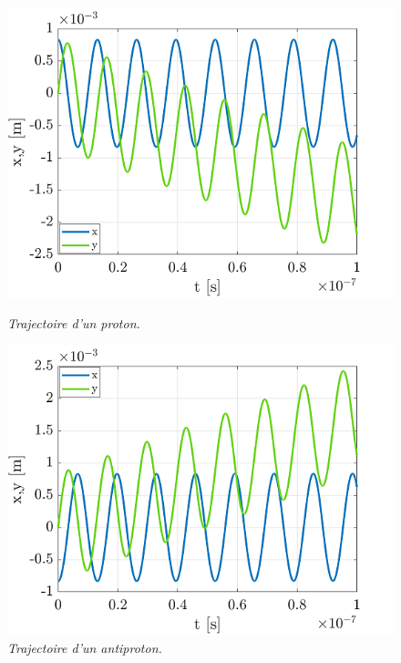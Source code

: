\documentclass[a4paper,12pt,twoside]{article}
\begin{document}
\begin{figure}
\begin{minipage}[c]{.46\linewidth}
					\centering
					\includegraphics[scale = 0.6]{proton_pos.png}
					\caption{\em\label{Fig: Pos Prot} Trajectoire d'un proton.}
				\end{minipage}
				\hfill%
				\begin{minipage}[c]{.46\linewidth}
					\centering
					\includegraphics[scale = 0.6]{antiproton_pos.png}
					\caption{\em\label{Fig: Pos Anti} Trajectoire d'un antiproton.}
				\end{minipage}
			\end{figure}
		
\end{document}
